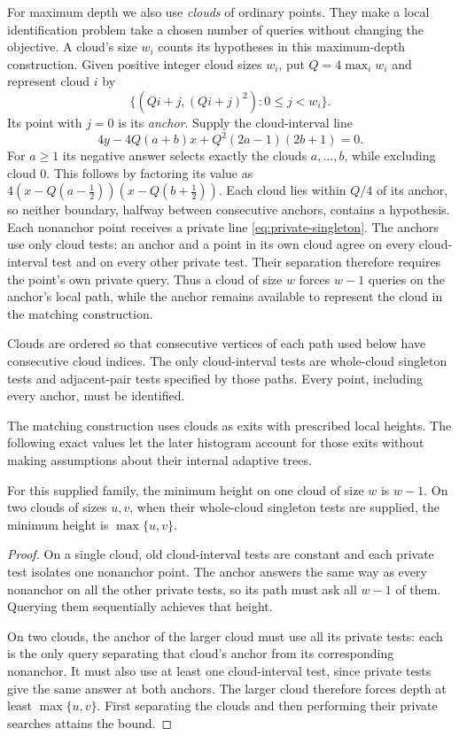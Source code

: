 For maximum depth we also use \emph{clouds} of ordinary points.
They make a local identification problem take a chosen number of
queries without changing the objective. A cloud's size $w_i$ counts
its hypotheses in this maximum-depth construction.
Given positive integer cloud sizes $w_i$, put $Q=4\max_i w_i$
and represent cloud $i$ by
\[
 \{(Qi+j,(Qi+j)^2):0\le j<w_i\}.
\]
Its point with $j=0$ is its \emph{anchor}. Supply the cloud-interval line
\begin{equation}\label{eq:cloud-interval}
 4y-4Q(a+b)x+Q^2(2a-1)(2b+1)=0.
\end{equation}
For $a\ge1$ its negative answer selects exactly the clouds
$a,\ldots,b$, while excluding cloud $0$.
This follows by factoring its value as
$4(x-Q(a-\tfrac12))(x-Q(b+\tfrac12))$.
Each cloud lies within $Q/4$ of its anchor, so neither boundary,
halfway between consecutive anchors, contains a hypothesis.
Each nonanchor point receives a private line
\eqref{eq:private-singleton}. The anchors use only cloud tests: an
anchor and a point in its own cloud agree on every cloud-interval test
and on every other private test. Their separation therefore requires
the point's own private query. Thus a cloud of size $w$ forces $w-1$
queries on the anchor's local path, while the anchor remains available
to represent the cloud in the matching construction.

Clouds are ordered so that consecutive vertices of each path used
below have consecutive cloud indices. The only cloud-interval tests
are whole-cloud singleton tests and adjacent-pair tests specified
by those paths. Every point, including every anchor, must be identified.

The matching construction uses clouds as exits with prescribed
local heights. The following exact values let the later histogram
account for those exits without making assumptions about their
internal adaptive trees.

\begin{lemma}\label{lem:cloud-heights}
For this supplied family, the minimum height on one cloud of size $w$
is $w-1$. On two clouds of sizes $u,v$, when their whole-cloud
singleton tests are supplied, the minimum height is $\max\{u,v\}$.
\end{lemma}
\begin{proof}
On a single cloud, old cloud-interval tests are constant and each
private test isolates one nonanchor point. The anchor answers the
same way as every nonanchor on all the other private tests, so its
path must ask all $w-1$ of them. Querying them sequentially achieves
that height.

On two clouds, the anchor of the larger cloud must use all its
private tests: each is the only query separating that cloud's anchor
from its corresponding nonanchor. It must also use at least one
cloud-interval test, since private tests give the same answer at
both anchors. The larger cloud therefore forces depth at least
$\max\{u,v\}$.
First separating the clouds and then performing their private
searches attains the bound.
\end{proof}

